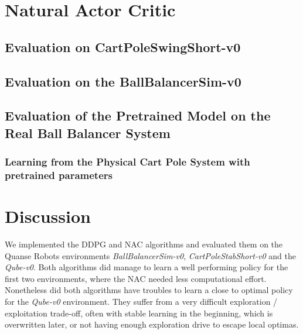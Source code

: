 \section{Natural Actor Critic}
\label{sec:nac}
\subsection{Evaluation on CartPoleSwingShort-v0}
\subsection{Evaluation on the BallBalancerSim-v0}
\subsection{Evaluation of the Pretrained Model on the Real Ball Balancer System}
\subsubsection{Learning from the Physical Cart Pole System with pretrained parameters}

\section{Discussion}
We implemented the DDPG and NAC algorithms and evaluated them on the Quanse Robots environments \textit{BallBalancerSim-v0}, \textit{CartPoleStabShort-v0} and the \textit{Qube-v0}. Both algorithms did manage to learn a well performing policy for the first two environments, where the NAC needed less computational effort. Nonetheless did both algorithms have troubles to learn a close to optimal policy for the \textit{Qube-v0} environment. They suffer from a very difficult exploration / exploitation trade-off, often with stable learning in the beginning, which is overwritten later, or not having enough exploration drive to escape local optimas.
\label{sec:conclusion}







